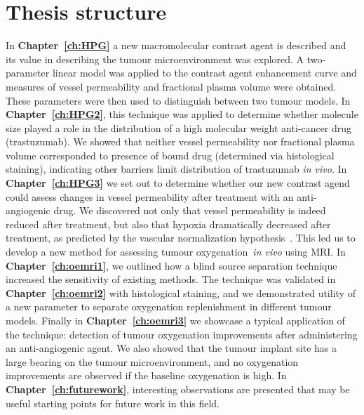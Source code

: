 \section{Thesis structure}

In \textbf{Chapter~\ref{ch:HPG}} a new macromolecular contrast agent is described and its value in describing the tumour microenvironment was explored.
A two-parameter linear model was applied to the contrast agent enhancement curve and measures of vessel permeability and fractional plasma volume were obtained.
These parameters were then used to distinguish between two tumour models.
In \textbf{Chapter~\ref{ch:HPG2}}, this technique was applied to determine whether molecule size played a role in the distribution of a high molecular weight anti-cancer drug (trastuzumab).
We showed that neither vessel permeability nor fractional plasma volume corresponded to presence of bound drug (determined via histological staining), indicating other barriers limit distribution of trastuzumab \emph{in vivo}.
In \textbf{Chapter~\ref{ch:HPG3}} we set out to determine whether our new contrast agend could assess changes in vessel permeability after treatment with an anti-angiogenic drug.
We discovered not only that vessel permeability is indeed reduced after treatment, but also that hypoxia dramatically decreased after treatment, as predicted by the vascular normalization hypothesis~\cite{Jain:2005gk}. 
This led us to develop a new method for assessing tumour oxygenation~\emph{in vivo} using MRI.
In \textbf{Chapter~\ref{ch:oemri1}}, we outlined how a blind source separation technique increased the sensitivity of existing methods. 
The technique was validated in \textbf{Chapter~\ref{ch:oemri2}} with histological staining, and we demonstrated utility of a new parameter to separate oxygenation replenishment in different tumour models.
Finally in \textbf{Chapter~\ref{ch:oemri3}} we showcase a typical application of the technique: detection of tumour oxygenation improvements after administering an anti-angiogenic agent. 
We also showed that the tumour implant site has a large bearing on the tumour microenvironment, and no oxygenation improvements are observed if the baseline oxygenation is high.
In \textbf{Chapter~\ref{ch:futurework}}, interesting observations are presented that may be useful starting points for future work in this field.